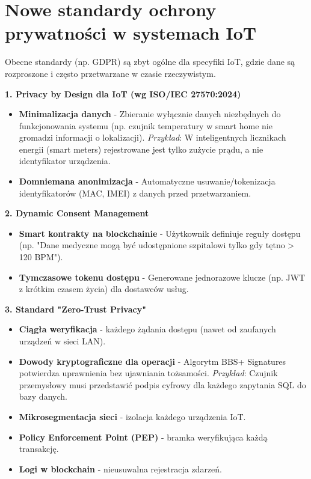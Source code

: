 \section{Nowe standardy ochrony prywatności w systemach IoT}
Obecne standardy (np. GDPR) są zbyt ogólne dla specyfiki IoT, gdzie dane są rozproszone i często przetwarzane w czasie rzeczywistym.

\textbf{1. Privacy by Design dla IoT (wg ISO/IEC 27570:2024)} \\
\begin{itemize}
    \item \textbf{Minimalizacja danych} - Zbieranie wyłącznie danych niezbędnych do funkcjonowania systemu (np. czujnik temperatury w smart home nie gromadzi informacji o lokalizacji). \textit{Przykład}: W inteligentnych licznikach energii (smart meters) rejestrowane jest tylko zużycie prądu, a nie identyfikator urządzenia.
    \item \textbf{Domniemana anonimizacja} - Automatyczne usuwanie/tokenizacja identyfikatorów (MAC, IMEI) z danych przed przetwarzaniem.
\end{itemize}

\textbf{2. Dynamic Consent Management} \\
\begin{itemize}
    \item \textbf{Smart kontrakty na blockchainie} - Użytkownik definiuje reguły dostępu (np. "Dane medyczne mogą być udostępnione szpitalowi tylko gdy tętno > 120 BPM").
    \item \textbf{Tymczasowe tokenu dostępu} - Generowane jednorazowe klucze (np. JWT z krótkim czasem życia) dla dostawców usług.
\end{itemize}

\textbf{3. Standard "Zero-Trust Privacy"} \\
\begin{itemize}
    \item \textbf{Ciągła weryfikacja} - każdego żądania dostępu (nawet od zaufanych urządzeń w sieci LAN).
    \item \textbf{Dowody kryptograficzne dla operacji} - Algorytm BBS+ Signatures potwierdza uprawnienia bez ujawniania tożsamości. \textit{Przykład}: Czujnik przemysłowy musi przedstawić podpis cyfrowy dla każdego zapytania SQL do bazy danych.
    \item \textbf{Mikrosegmentacja sieci} - izolacja każdego urządzenia IoT.
    \item \textbf{Policy Enforcement Point (PEP)} - bramka weryfikująca każdą transakcję.
    \item \textbf{Logi w blockchain} - nieusuwalna rejestracja zdarzeń.
\end{itemize}





